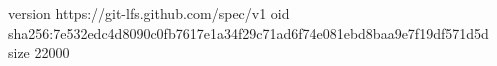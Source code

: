 version https://git-lfs.github.com/spec/v1
oid sha256:7e532edc4d8090c0fb7617e1a34f29c71ad6f74e081ebd8baa9e7f19df571d5d
size 22000
